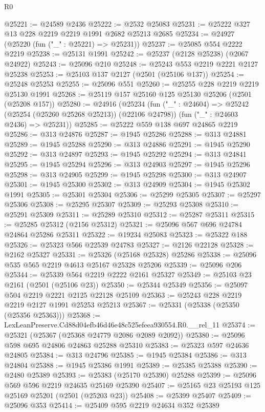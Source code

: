 \begin{lexlean}{R0}
\begin{coremodule}
@25221 := @24589 @2436
@25222 := @2532 @25083
@25231 := @25222 @327 @13 @228 @2219 @2219 @1991 @2682 @25213 @2685
@25234 := @24927 (@25220 (fun ("_" : @25221) => @25231))
@25237 := @25085 @554 @2222 @2219
@25238 := @25131 @1991
@25242 := @25237 (@2128 @25238) (@2067 @24922)
@25243 := @25096 @210
@25248 := @25243 @553 @2219 @2221 @2127 @25238
@25253 := @25103 @137 @2127 (@2501 (@25106 @137))
@25254 := @25248 @25253
@25255 := @25096 @551
@25260 := @25255 @228 @2219 @2219 @25130 @1991
@25268 := @25119 @157 @25160 @125 @25130 @25206 (@2501 (@25208 @157))
@25280 := @24916
    (@25234
      (fun ("_" : @24604) => @25242 (@25254 (@25260 @25268 @25213)) (@22106 @24798))
      (fun ("_" : @24603 @2436) => @25231))
@25285 := @25222 @559 @138 @697 @24865 @2219
@25286 := @313 @24876
@25287 := @1945 @25286
@25288 := @313 @24881
@25289 := @1945 @25288
@25290 := @313 @24886
@25291 := @1945 @25290
@25292 := @313 @24897
@25293 := @1945 @25292
@25294 := @313 @24841
@25295 := @1945 @25294
@25296 := @313 @24903
@25297 := @1945 @25296
@25298 := @313 @24905
@25299 := @1945 @25298
@25300 := @313 @24907
@25301 := @1945 @25300
@25302 := @313 @24909
@25304 := @1945 @25302 @1991
@25305 := @25301 @25304
@25306 := @25299 @25305
@25307 := @25297 @25306
@25308 := @25295 @25307
@25309 := @25293 @25308
@25310 := @25291 @25309
@25311 := @25289 @25310
@25312 := @25287 @25311
@25315 := @25285 @25312 (@2156 @25312)
@25321 := @25096 @567 @696 @24784 @24864 @25286 @25311
@25322 := @19234 @25083
@25323 := @25322 @188
@25326 := @25323 @566 @22539 @24783
@25327 := @2126 @22128
@25328 := @2162 @25327
@25331 := @25326 (@25168 @25328) @25286
@25338 := @25096 @535 @565 @2219 @4613 @25167 @25328 @25206
@25339 := @25096 @206
@25344 := @25339 @564 @2219 @2222 @2161 @25327
@25349 := @25103 @23 @2161 (@2501 (@25106 @23))
@25350 := @25344 @25349
@25356 := @25097 @504 @2219 @2221 @2125 @22128 @25109
@25363 := @25243 @228 @2219 @2219 @2127 @1991 @25253 @25213
@25367 := @25331 (@25338 (@25350 (@25356 @25363)))
@25368 := LexLeanPreserve.Cd88d04efb46d46e48c525efeea930554.R0.__rel_11
@25374 := @25321 (@25367 (@25368 @24779 @2086 @2089 @2092))
@25380 := @25096 @598 @695 @24806 @24863 @25288 @25310
@25383 := @25323 @597 @24636 @24805
@25384 := @313 @24796
@25385 := @1945 @25384
@25386 := @313 @24804
@25388 := @1945 @25386 @1991
@25389 := @25385 @25388
@25390 := @2480 @25389
@25393 := @25383 (@25170 @25390) @25288
@25399 := @25096 @569 @596 @2219 @24635 @25169 @25390
@25407 := @25165 @23 @25193 @125 @25169 @25201 (@2501 (@25203 @23))
@25408 := @25399 @25407
@25409 := @25096 @353
@25414 := @25409 @595 @2219 @24634 @352 @25389

\end{coremodule}
\end{lexlean}
